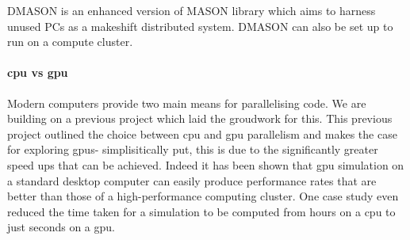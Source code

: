 \documentclass{UoYCSproject}
\begin{document}
DMASON is an enhanced version of \gls{MASON} library which aims to harness unused PCs as a makeshift distributed system.
DMASON can also be set up to run on a compute cluster.

\paragraph{\acrshort{cpu} vs \acrshort{gpu}}
\label{cpu_v_gpu}
Modern computers provide two main means for parallelising code.
We are building on a previous project\cite{phil_diss} which laid the groudwork for this.
This previous project outlined the choice between \acrshort{cpu} and \acrshort{gpu} parallelism and makes the case for exploring \acrshort{gpu}s- simplisitically put, this is due to the significantly greater speed ups that can be achieved.
Indeed it has been shown that \acrshort{gpu} simulation on a standard desktop computer can easily produce performance rates that are better than those of a high-performance computing cluster\cite{flame_simulation}.
One case study even reduced the time taken for a simulation to be computed from hours on a \acrshort{cpu} to just seconds on a \acrshort{gpu}\cite{flame_keratinocyte}.
\end{document}

